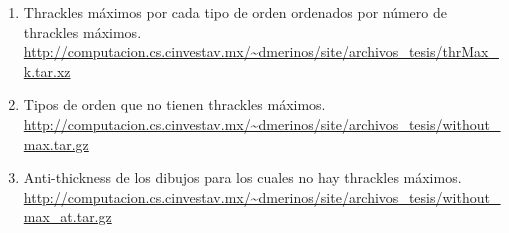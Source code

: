\label{apendice-ligas}
\begin{enumerate}
  \item Thrackles máximos por cada tipo de orden ordenados por número de thrackles máximos.
  \label{link-thrMax_k}
  \url{http://computacion.cs.cinvestav.mx/~dmerinos/site/archivos_tesis/thrMax_k.tar.xz}
  \item Tipos de orden que no tienen thrackles máximos.
  \label{link-thrWithoutMax}
  \url{http://computacion.cs.cinvestav.mx/~dmerinos/site/archivos_tesis/without_max.tar.gz}
  \item Anti-thickness de los dibujos para los cuales no hay thrackles máximos.
  \label{link-thrWithoutMax-at}
  \url{http://computacion.cs.cinvestav.mx/~dmerinos/site/archivos_tesis/without_max_at.tar.gz}
\end{enumerate}
